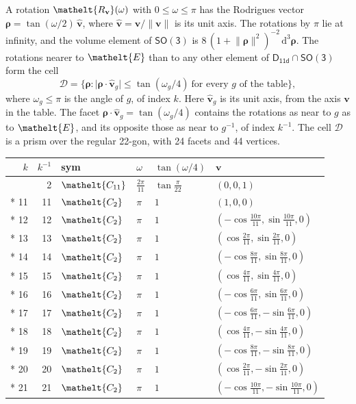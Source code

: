 \documentclass[10pt,a4paper]{article}
\numberwithin{equation}{section}
\newcommand{\eltfont}[1]{{\let\sigma\eltsigma\mathelt{#1}}}
\newcommand{\grp}[1]{\mathsf{#1}}
\newcommand{\cls}[1]{\eltfont{#1}}
\newcommand{\elt}[1]{\eltfont{#1}}
\newcommand{\dirvec}[3]{(#1, #2, #3)}
\newcommand{\unitaxis}{\hat{\mathbf{v}}}
\newcommand{\vv}{\mathbf{v}}
\newcommand{\diff}{\mathrm{d}}
\newcommand{\rodrigues}{\boldsymbol{\rho}}
\newcommand{\fcell}{\mathcal{D}}
\begin{document}
\leavevmode\label{n:vector.rodrigues}\label{n:vector.unitaxis}A rotation $\elt{R_{\vv}}(\omega)$ with $0 \le \omega \le \pi$ has the Rodrigues vector $\rodrigues = \tan(\omega/2)\,\unitaxis$, where $\unitaxis = \vv/\lVert\vv\rVert$ is its unit axis. The rotations by $\pi$ lie at infinity, and the volume element of \href{SO3.pdf}{$\grp{SO(3)}$} is $8\,(1 + \lVert\rodrigues\rVert^2)^{-2}\,\diff^3\rodrigues$.
\leavevmode\label{n:set.cell}The rotations nearer to $\elt{E}$ than to any other element of $\grp{D_{11d}} \cap \grp{SO(3)}$ form the cell
\begin{equation}\label{e:cell}\fcell = \bigl\{\rodrigues : \lvert\rodrigues\cdot\unitaxis_g\rvert \le \tan(\omega_g/4)\ \text{for every $g$ of the table}\bigr\},\end{equation}
where $\omega_g \le \pi$ is the angle of $g$, of index $k$. Here $\unitaxis_g$ is its unit axis, from the axis $\vv$ in the table. The facet $\rodrigues\cdot\unitaxis_g = \tan(\omega_g/4)$ contains the rotations as near to $g$ as to $\elt{E}$, and its opposite those as near to $g^{-1}$, of index $k^{-1}$. The cell $\fcell$ is a prism over the regular 22-gon, with 24 facets and 44 vertices.
{\small{\renewcommand{\arraystretch}{1.3}\begin{longtable}{@{}rrllll@{}}\toprule
$k$ & $k^{-1}$ & sym & $\omega$ & $\tan(\omega/4)$ & $\vv$\\\midrule\endhead
\bottomrule\endfoot\endlastfoot
1 & 2 & $\cls{C_{11}}$ & $\tfrac{2\pi}{11}$ & $\tan\tfrac{\pi}{22}$ & $\dirvec{0}{0}{1}$\\*
11 & 11 & $\cls{C_{2}}$ & $\pi$ & $1$ & $\dirvec{1}{0}{0}$\\*
12 & 12 & $\cls{C_{2}}$ & $\pi$ & $1$ & $\dirvec{-\cos\tfrac{10\pi}{11}}{\sin\tfrac{10\pi}{11}}{0}$\\*
13 & 13 & $\cls{C_{2}}$ & $\pi$ & $1$ & $\dirvec{\cos\tfrac{2\pi}{11}}{\sin\tfrac{2\pi}{11}}{0}$\\*
14 & 14 & $\cls{C_{2}}$ & $\pi$ & $1$ & $\dirvec{-\cos\tfrac{8\pi}{11}}{\sin\tfrac{8\pi}{11}}{0}$\\*
15 & 15 & $\cls{C_{2}}$ & $\pi$ & $1$ & $\dirvec{\cos\tfrac{4\pi}{11}}{\sin\tfrac{4\pi}{11}}{0}$\\*
16 & 16 & $\cls{C_{2}}$ & $\pi$ & $1$ & $\dirvec{-\cos\tfrac{6\pi}{11}}{\sin\tfrac{6\pi}{11}}{0}$\\*
17 & 17 & $\cls{C_{2}}$ & $\pi$ & $1$ & $\dirvec{-\cos\tfrac{6\pi}{11}}{-\sin\tfrac{6\pi}{11}}{0}$\\*
18 & 18 & $\cls{C_{2}}$ & $\pi$ & $1$ & $\dirvec{\cos\tfrac{4\pi}{11}}{-\sin\tfrac{4\pi}{11}}{0}$\\*
19 & 19 & $\cls{C_{2}}$ & $\pi$ & $1$ & $\dirvec{-\cos\tfrac{8\pi}{11}}{-\sin\tfrac{8\pi}{11}}{0}$\\*
20 & 20 & $\cls{C_{2}}$ & $\pi$ & $1$ & $\dirvec{\cos\tfrac{2\pi}{11}}{-\sin\tfrac{2\pi}{11}}{0}$\\*
21 & 21 & $\cls{C_{2}}$ & $\pi$ & $1$ & $\dirvec{-\cos\tfrac{10\pi}{11}}{-\sin\tfrac{10\pi}{11}}{0}$\\
\bottomrule\end{longtable}}}
\end{document}
